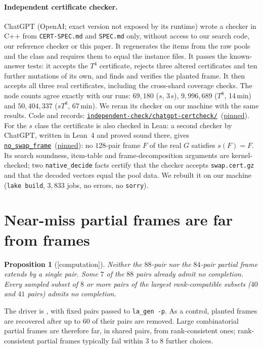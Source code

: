 \documentclass[11pt]{article}
\newtheorem{proposition}[theorem]{Proposition}
\theoremstyle{definition}
\theoremstyle{remark}
\newcommand{\evidence}[1]{\textsf{[#1]}}
\newcommand{\repourl}{https://github.com/alectionary/vibe-math}
\newcommand{\cdir}{formalization/canonical-width/c16}
\newcommand{\rdir}{formalization/canonical-width/c16/restricted-frames-20261031}
\newcommand{\ours}[2]{\href{\repourl/blob/master/\rdir/#1}{#2}}
\newcommand{\oursf}[1]{\ours{#1}{\texttt{\detokenize{#1}}}}
\begin{document}
\paragraph{Independent certificate checker.} ChatGPT (OpenAI; exact version not exposed by its runtime) wrote a checker in C++ from \texttt{CERT-SPEC.md} and \texttt{SPEC.md} only, without access to our search code, our reference checker or this paper. It regenerates the items from the raw pools and the class and requires them to equal the instance files. It passes the known-answer tests: it accepts the $T^4$ certificate, rejects three altered certificates and ten further mutations of its own, and finds and verifies the planted frame. It then accepts all three real certificates, including the cross-shard coverage checks. The node counts agree exactly with our runs: $69{,}180$ ($s$, 3\,s), $9{,}996{,}689$ ($T^8$, 14\,min) and $50{,}404{,}337$ ($sT^8$, 67\,min). We reran its checker on our machine with the same results. Code and records: \href{\repourl/tree/master/\cdir/independent-check/chatgpt-certcheck}{\texttt{independent-check/chatgpt-certcheck/}}~(\href{\repourl/tree/c359918c5b79ccc86d305ac611dad8291bc0a3dd/\cdir/independent-check/chatgpt-certcheck}{pinned}). For the $s$ class the certificate is also checked in Lean: a second checker by ChatGPT, written in Lean~4 and proved sound there, gives \href{\repourl/blob/master/\cdir/lean/CertGPTNoSwap.lean\#L92}{\texttt{no\_swap\_frame}}~(\href{\repourl/blob/5f6872bd0f441c466ccc01260ebf784599b08b56/\cdir/lean/CertGPTNoSwap.lean\#L92}{pinned}): no $128$-pair frame $F$ of the real $G$ satisfies $s(F)=F$. Its search soundness, item-table and frame-decomposition arguments are kernel-checked; two \texttt{native\_decide} facts certify that the checker accepts \texttt{swap.cert.gz} and that the decoded vectors equal the pool data. We rebuilt it on our machine (\texttt{lake build}, $3{,}833$ jobs, no errors, no \texttt{sorry}).

\section{Near-miss partial frames are far from frames}\label{sec:nearmiss}

\begin{proposition}[\evidence{computation}]
Neither the $88$-pair nor the $84$-pair partial frame extends by a single pair. Some $7$ of the $88$ pairs already admit no completion. Every sampled subset of $8$ or more pairs of the largest rank-compatible subsets ($40$ and $41$ pairs) admits no completion.
\end{proposition}
The driver is \oursf{la/nearmiss.py}, with fixed pairs passed to \texttt{la\_gen -p}. As a control, planted frames are recovered after up to $60$ of their pairs are removed. Large combinatorial partial frames are therefore far, in shared pairs, from rank-consistent ones; rank-consistent partial frames typically fail within $3$ to $8$ further choices.
\end{document}
